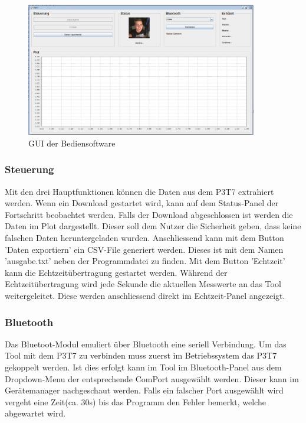 \begin{figure}[H]
\begin{center}
\includegraphics[width=0.9\textwidth]{images/Software_GUI.png}
\caption{GUI der Bediensoftware}
\end{center}
\end{figure}

\subsubsection*{Steuerung}

Mit den drei Hauptfunktionen können die Daten aus dem P3T7 extrahiert werden. Wenn ein Download gestartet wird, kann auf dem Status-Panel der Fortschritt beobachtet werden. Falls der Download abgeschlossen ist werden die Daten im Plot dargestellt. Dieser soll dem Nutzer die Sicherheit geben, dass keine falschen Daten heruntergeladen wurden. Anschliessend kann mit dem Button 'Daten exportiern' ein CSV-File generiert werden. Dieses ist mit dem Namen 'ausgabe.txt' neben der Programmdatei zu finden. Mit dem Button 'Echtzeit' kann die Echtzeitübertragung gestartet werden. Während der Echtzeitübertragung wird jede Sekunde die aktuellen Messwerte an das Tool weitergeleitet. Diese werden anschliessend direkt im Echtzeit-Panel angezeigt.

\subsubsection*{Bluetooth}

Das Bluetoot-Modul emuliert über Bluetooth eine seriell Verbindung. Um das Tool mit dem P3T7 zu verbinden muss zuerst im Betriebssystem das P3T7 gekoppelt werden.  Ist dies erfolgt kann im Tool im Bluetooth-Panel aus dem Dropdown-Menu der entsprechende ComPort ausgewählt werden. Dieser kann im Gerätemanager nachgeschaut werden. Falls ein falscher Port ausgewählt wird vergeht eine Zeit(ca. 30s) bis das Programm den Fehler bemerkt, welche abgewartet wird.



